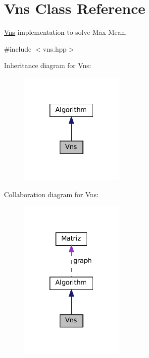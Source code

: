 \hypertarget{classVns}{}\section{Vns Class Reference}
\label{classVns}


\hyperlink{classVns}{Vns} implementation to solve Max Mean.  




{\ttfamily \#include $<$vns.\+hpp$>$}



Inheritance diagram for Vns\+:\nopagebreak
\begin{figure}[H]
\begin{center}
\leavevmode
\includegraphics[width=145pt]{classVns__inherit__graph}
\end{center}
\end{figure}


Collaboration diagram for Vns\+:\nopagebreak
\begin{figure}[H]
\begin{center}
\leavevmode
\includegraphics[width=145pt]{classVns__coll__graph}
\end{center}
\end{figure}
